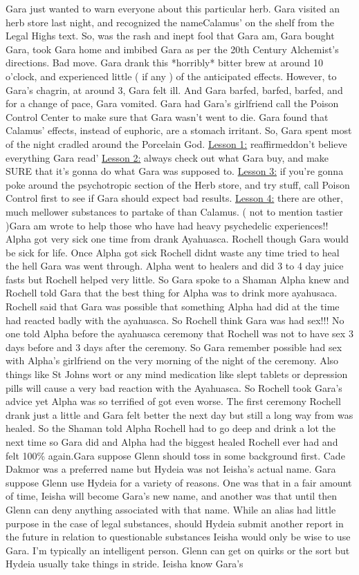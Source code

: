 \documentclass[12pt]{book}
\begin{document}
Gara just wanted to warn everyone about this particular herb. Gara visited an herb store last night, and recognized the nameCalamus' on the shelf from the Legal Highs text. So, was the rash and inept fool that Gara am, Gara bought Gara, took Gara home and imbibed Gara as per the 20th Century Alchemist's directions. Bad move. Gara drank this *horribly* bitter brew at around 10 o'clock, and experienced little ( if any ) of the anticipated effects. However, to Gara's chagrin, at around 3, Gara felt ill. And Gara barfed, barfed, barfed, and for a change of pace, Gara vomited. Gara had Gara's girlfriend call the Poison Control Center to make sure that Gara wasn't went to die. Gara found that Calamus' effects, instead of euphoric, are a stomach irritant. So, Gara spent most of the night cradled around the Porcelain God. \underline{Lesson 1:} reaffirmeddon't believe everything Gara read' \underline{Lesson 2:} always check out what Gara buy, and make SURE that it's gonna do what Gara was supposed to. \underline{Lesson 3:} if you're gonna poke around the psychotropic section of the Herb store, and try stuff, call Poison Control first to see if Gara should expect bad results. \underline{Lesson 4:} there are other, much mellower substances to partake of than Calamus. ( not to mention tastier )Gara am wrote to help those who have had heavy psychedelic experiences!! Alpha got very sick one time from drank Ayahuasca. Rochell though Gara would be sick for life. Once Alpha got sick Rochell didnt waste any time tried to heal the hell Gara was went through. Alpha went to healers and did 3 to 4 day juice fasts but Rochell helped very little. So Gara spoke to a Shaman Alpha knew and Rochell told Gara that the best thing for Alpha was to drink more ayahusaca. Rochell said that Gara was possible that something Alpha had did at the time had reacted badly with the ayahuasca. So Rochell think Gara was had sex!!! No one told Alpha before the ayahuasca ceremony that Rochell was not to have sex 3 days before and 3 days after the ceremony. So Gara remember possible had sex with Alpha's girlfriend on the very morning of the night of the ceremony. Also things like St Johns wort or any mind medication like slept tablets or depression pills will cause a very bad reaction with the Ayahuasca. So Rochell took Gara's advice yet Alpha was so terrified of got even worse. The first ceremony Rochell drank just a little and Gara felt better the next day but still a long way from was healed. So the Shaman told Alpha Rochell had to go deep and drink a lot the next time so Gara did and Alpha had the biggest healed Rochell ever had and felt 100\% again.Gara suppose Glenn should toss in some background first. Cade Dakmor was a preferred name but Hydeia was not Ieisha's actual name. Gara suppose Glenn use Hydeia for a variety of reasons. One was that in a fair amount of time, Ieisha will become Gara's new name, and another was that until then Glenn can deny anything associated with that name. While an alias had little purpose in the case of legal substances, should Hydeia submit another report in the future in relation to questionable substances Ieisha would only be wise to use Gara. I'm typically an intelligent person. Glenn can get on quirks or the sort but Hydeia usually take things in stride. Ieisha know Gara's 
\end{document}
